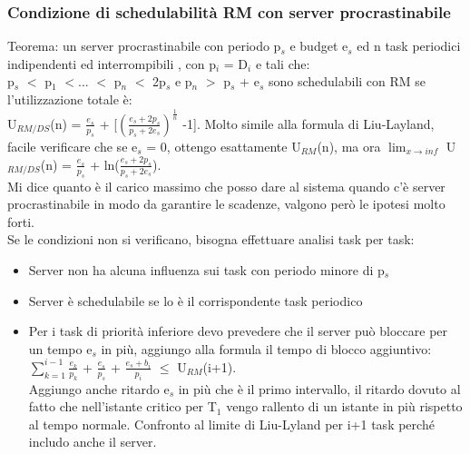\documentclass[12pt, oneside]{extbook}
\begin{document}
\subsubsection{Condizione di schedulabilità RM con server procrastinabile}
Teorema: un server procrastinabile con periodo p$_{s}$ e budget e$_{s}$ ed n task periodici indipendenti ed interrompibili , con p$_{i}$ = D$_{i}$ e tali che:\\ p$_{s}$ $<$ p$_{1}$ $<$... $<$ p$_{n}$ $<$ 2p$_{s}$ e p$_{n}$ $>$ p$_{s}$ + e$_{s}$ sono schedulabili con RM se l'utilizzazione totale è:\\
U$_{RM/DS}$(n) = $\frac{e_s}{p_s}$ + [$(\frac{e_s + 2p_s}{p_s +2e_s})^{\frac{1}{n}}$ -1]. Molto simile alla formula di Liu-Layland, facile verificare che se e$_{s}$ = 0, ottengo esattamente U$_{RM}$(n), ma ora $\lim_{x \to inf}$ U$_{RM/DS}$(n) = $\frac{e_s}{p_s}$ + ln($\frac{e_s + 2p_s}{p_s +2e_s}$).\\ Mi dice quanto è il carico massimo che posso dare al sistema quando c'è server procrastinabile in modo da garantire le scadenze, valgono però le ipotesi molto forti.\\ Se le condizioni non si verificano, bisogna effettuare analisi task per task:
\begin{itemize}
\item Server non ha alcuna influenza sui task con periodo minore di p$_{s}$
\item Server è schedulabile se lo è il corrispondente task periodico
\item Per i task di priorità inferiore devo prevedere che il server può bloccare per un tempo e$_{s}$ in più, aggiungo alla formula il tempo di blocco aggiuntivo:\\ $\sum\limits_{k = 1}^{i-1} \frac{e_k}{p_k}$ + $\frac{e_s}{p_s}$ + $\frac{e_s + b_i}{p_i}$ $\leq$ U$_{RM}$(i+1).\\ Aggiungo anche ritardo e$_{s}$ in più che è il primo intervallo, il ritardo dovuto al fatto che nell'istante critico per T$_{1}$ vengo rallento di un istante in più rispetto al tempo normale. Confronto al limite di Liu-Lyland per i+1 task perché includo anche il server.
\end{itemize}
\end{document}
